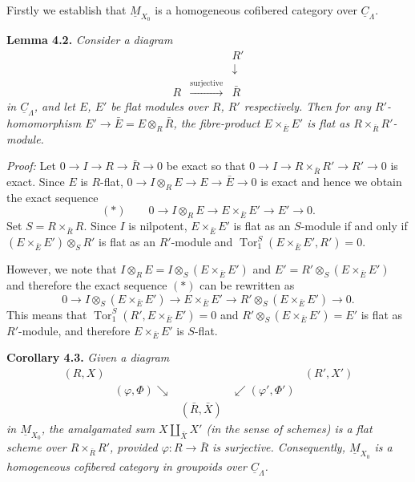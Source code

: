 \documentclass[11pt]{article}
\theoremstyle{plain}
\theoremstyle{definition}
\theoremstyle{remark}
\DeclareMathOperator{\Tor}{Tor}
\begin{document}
Firstly we establish that $\underline{M}_{X_0}$ is a homogeneous cofibered category over $\underline{C}_\Lambda$.

\medskip
\noindent\textbf{Lemma 4.2.} \textit{Consider a diagram}
\[
\begin{array}{ccc}
& & R' \\
& & \downarrow \\
R & \xrightarrow{\text{surjective}} & \bar{R}
\end{array}
\]
\textit{in $\underline{C}_\Lambda$, and let $E$, $E'$ be flat modules over $R$, $R'$ respectively. Then for any $R'$-homomorphism $E' \to \bar{E} = E \otimes_R \bar{R}$, the fibre-product $E \times_{\bar{E}} E'$ is flat as $R \times_{\bar{R}} R'$-module.}

\medskip
\noindent\textit{Proof:} Let $0 \to I \to R \to \bar{R} \to 0$ be exact so that $0 \to I \to R \times_{\bar{R}} R' \to R' \to 0$ is exact. Since $E$ is $R$-flat, $0 \to I \otimes_R E \to E \to \bar{E} \to 0$ is exact and hence we obtain the exact sequence
\[(*) \qquad 0 \to I \otimes_R E \to E \times_{\bar{E}} E' \to E' \to 0.\]
Set $S = R \times_{\bar{R}} R$. Since $I$ is nilpotent, $E \times_{\bar{E}} E'$ is flat as an $S$-module if and only if $(E \times_{\bar{E}} E') \otimes_S R'$ is flat as an $R'$-module and $\Tor_1^S(E \times_{\bar{E}} E', R') = 0$.

However, we note that $I \otimes_R E = I \otimes_S (E \times_{\bar{E}} E')$ and $E' = R' \otimes_S (E \times_{\bar{E}} E')$ and therefore the exact sequence $(*)$ can be rewritten as
\[0 \to I \otimes_S (E \times_{\bar{E}} E') \to E \times_{\bar{E}} E' \to R' \otimes_S (E \times_{\bar{E}} E') \to 0.\]
This means that $\Tor_1^S(R', E \times_{\bar{E}} E') = 0$ and $R' \otimes_S (E \times_{\bar{E}} E') = E'$ is flat as $R'$-module, and therefore $E \times_{\bar{E}} E'$ is $S$-flat.

\medskip
\noindent\textbf{Corollary 4.3.} \textit{Given a diagram}
\[
\begin{array}{ccccc}
(R, X) & & & & (R', X') \\
& \scriptstyle{(\varphi,\Phi)}\searrow & & \swarrow\scriptstyle{(\varphi',\Phi')} & \\
& & (\bar{R}, \bar{X}) & &
\end{array}
\]
\textit{in $\underline{M}_{X_0}$, the amalgamated sum $X \amalg_{\bar{X}} X'$ (in the sense of schemes) is a flat scheme over $R \times_{\bar{R}} R'$, provided $\varphi : R \to \bar{R}$ is surjective. Consequently, $\underline{M}_{X_0}$ is a homogeneous cofibered category in groupoids over $\underline{C}_\Lambda$.}
\end{document}
